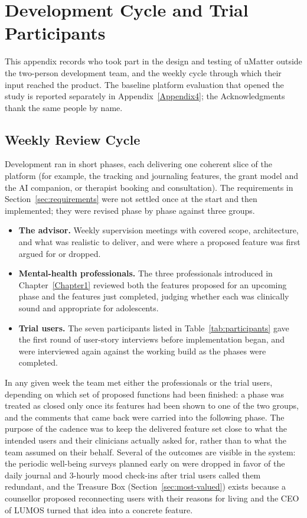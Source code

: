 \chapter{Development Cycle and Trial Participants}
\label{Appendix6}

This appendix records who took part in the design and testing of uMatter
outside the two-person development team, and the weekly cycle through which
their input reached the product. The baseline platform evaluation that opened
the study is reported separately in Appendix~\ref{Appendix4}; the
Acknowledgments thank the same people by name.

\section{Weekly Review Cycle}
\label{sec:weekly-cycle}

Development ran in short phases, each delivering one coherent slice of the
platform (for example, the tracking and journaling features, the grant model
and the AI companion, or therapist booking and consultation). The requirements
in Section~\ref{sec:requirements} were not settled once at the start and then
implemented; they were revised phase by phase against three groups.

\begin{itemize}
  \item \textbf{The advisor.} Weekly supervision meetings with
    \tenGVHD{} covered scope, architecture, and what was realistic to
    deliver, and were where a proposed feature was first argued for or
    dropped.

  \item \textbf{Mental-health professionals.} The three professionals
    introduced in Chapter~\ref{Chapter1} reviewed both the features proposed
    for an upcoming phase and the features just completed, judging whether
    each was clinically sound and appropriate for adolescents.

  \item \textbf{Trial users.} The seven participants listed in
    Table~\ref{tab:participants} gave the first round of user-story interviews
    before implementation began, and were interviewed again against the
    working build as the phases were completed.
\end{itemize}

In any given week the team met either the professionals or the trial users,
depending on which set of proposed functions had been finished: a phase was
treated as closed only once its features had been shown to one of the two
groups, and the comments that came back were carried into the following phase.
The purpose of the cadence was to keep the delivered feature set close to what
the intended users and their clinicians actually asked for, rather than to what
the team assumed on their behalf. Several of the outcomes are visible in the
system: the periodic well-being surveys planned early on were dropped in favor
of the daily journal and 3-hourly mood check-ins after trial users called them
redundant, and the Treasure Box (Section~\ref{sec:most-valued}) exists because
a counsellor proposed reconnecting users with their reasons for living and the
CEO of LUMOS turned that idea into a concrete feature.

